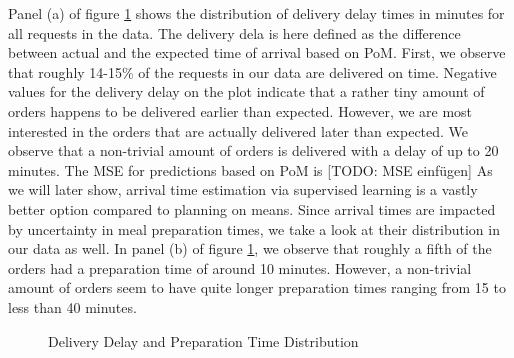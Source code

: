 Panel (a) of figure \ref{fig:prepdelay} shows the distribution of delivery delay times in minutes for all requests in the data. The delivery dela is here defined as the difference between actual and the expected time of arrival based on PoM. First, we observe that roughly 14-15\% of the requests in our data are delivered on time. Negative values for the delivery delay on the plot indicate that a rather tiny amount of orders happens to be delivered earlier than expected. However, we are most interested in the orders that are actually delivered later than expected. We observe that a non-trivial amount of orders is delivered with a delay of up to 20 minutes. The MSE for predictions based on PoM is
[TODO: MSE einfügen]
\newline
As we will later show, arrival time estimation via supervised learning is a vastly better option compared to planning on means.
Since arrival times are impacted by uncertainty in meal preparation times, we take a look at their distribution in our data as well. In panel (b) of figure \ref{fig:prepdelay}, we observe that roughly a fifth of the orders had a preparation time of around 10 minutes. However, a non-trivial amount of orders seem to have quite longer preparation times ranging from 15 to less than 40 minutes. 
\begin{figure}[h]
	\centering
	\caption{Delivery Delay and Preparation Time Distribution}
	\label{fig:prepdelay}
\end{figure}

